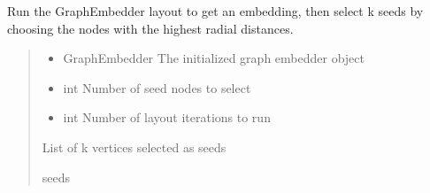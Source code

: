 \documentclass[letterpaper,10pt,english]{sphinxmanual}
\begin{document}
\begin{fulllineitems}
\label{\detokenize{graphem:graphem.influence.graphem_seed_selection}}
\pysigstartsignatures
{}
\pysigstopsignatures
\sphinxAtStartPar
Run the GraphEmbedder layout to get an embedding, then select
k seeds by choosing the nodes with the highest radial distances.
\begin{quote}\begin{description}
\begin{itemize}
\item {} 
\sphinxAtStartPar
{} \textendash{} GraphEmbedder
The initialized graph embedder object

\item {} 
\sphinxAtStartPar
{} \textendash{} int
Number of seed nodes to select

\item {} 
\sphinxAtStartPar
{} \textendash{} int
Number of layout iterations to run

\end{itemize}

\sphinxAtStartPar
\begin{description}
\sphinxAtStartPar
List of k vertices selected as seeds

\end{description}


\sphinxAtStartPar
seeds

\end{description}\end{quote}

\end{fulllineitems}

\end{document}
